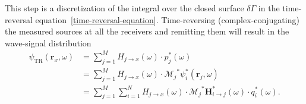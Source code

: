 This step is a discretization of the integral over the closed surface \(\delta \Gamma \) in the time-reversal equation~\eqref{time-reversal-equation}.
Time-reversing (complex-conjugating) the measured sources at all the receivers and remitting them will result in the wave-signal distribution
\begin{align}
    \psi_{\text{TR}}(\bm{r}_x, \omega)  &= \sum_{j=1}^{M} H_{j\rightarrow x}(\omega) \cdot p_j^*(\omega) \\
                                        &= \sum_{j=1}^{M} H_{j\rightarrow x}(\omega) \cdot {\mathcal{M}_j}^* \psi^*_i(\bm{r}_j, \omega) \\
                                        &= \sum_{j=1}^{M} \sum_{i=1}^{N} H_{j\rightarrow x}(\omega) \cdot {\mathcal{M}_j}^* \bm{H}^*_{i\rightarrow j}(\omega) \cdot q^*_i(\omega). \label{eq:signal-time-reversal}
\end{align}

